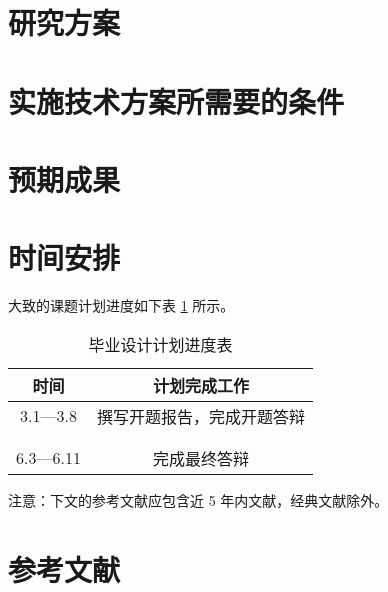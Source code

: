 \documentclass[UTF8,AutoFakeBold,AutoFakeSlant,zihao=-4]{ctexart}
\begin{document}
\section{研究方案}
\subsection{}
\subsection{}

\section{实施技术方案所需要的条件}
\subsection{}
\subsection{}

\section{预期成果}

\section{时间安排}
大致的课题计划进度如下表 \ref{tab:progress} 所示。


\renewcommand*\arraystretch{2.4} 
\begin{table}[!ht]
  \centering
  \caption{毕业设计计划进度表}
  \label{tab:progress}
  \begin{tabular}{@{}cc@{}}
    \toprule
    时间 & 计划完成工作       \\ \midrule
    3.1—3.8 & 撰写开题报告，完成开题答辩 \\\hline
    & \\\hline
    & \\\hline
    6.3—6.11 & 完成最终答辩\\\bottomrule
  \end{tabular}
\end{table}


注意：下文的参考文献应包含近 5 年内文献，经典文献除外。

\section{参考文献}

\end{document}
